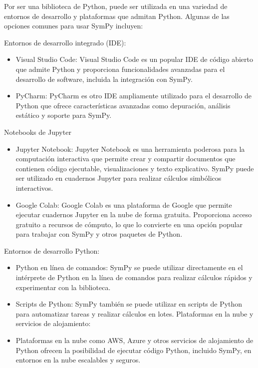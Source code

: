 \documentclass[11pt]{article}
\begin{document}
Por ser una biblioteca de Python, puede ser utilizada en una variedad de
entornos de desarrollo y plataformas que admitan Python. Algunas de las
opciones comunes para usar SymPy incluyen:

Entornos de desarrollo integrado (IDE):

\begin{itemize}
\item
  Visual Studio Code: Visual Studio Code es un popular IDE de código
  abierto que admite Python y proporciona funcionalidades avanzadas para
  el desarrollo de software, incluida la integración con SymPy.
\item
  PyCharm: PyCharm es otro IDE ampliamente utilizado para el desarrollo
  de Python que ofrece características avanzadas como depuración,
  análisis estático y soporte para SymPy.
\end{itemize}

Notebooks de Jupyter

\begin{itemize}
\item
  Jupyter Notebook: Jupyter Notebook es una herramienta poderosa para la
  computación interactiva que permite crear y compartir documentos que
  contienen código ejecutable, visualizaciones y texto explicativo.
  SymPy puede ser utilizado en cuadernos Jupyter para realizar cálculos
  simbólicos interactivos.
\item
  Google Colab: Google Colab es una plataforma de Google que permite
  ejecutar cuadernos Jupyter en la nube de forma gratuita. Proporciona
  acceso gratuito a recursos de cómputo, lo que lo convierte en una
  opción popular para trabajar con SymPy y otros paquetes de Python.
\end{itemize}

Entornos de desarrollo Python:

\begin{itemize}
\item
  Python en línea de comandos: SymPy se puede utilizar directamente en
  el intérprete de Python en la línea de comandos para realizar cálculos
  rápidos y experimentar con la biblioteca.
\item
  Scripts de Python: SymPy también se puede utilizar en scripts de
  Python para automatizar tareas y realizar cálculos en lotes.
  Plataformas en la nube y servicios de alojamiento:
\item
  Plataformas en la nube como AWS, Azure y otros servicios de
  alojamiento de Python ofrecen la posibilidad de ejecutar código
  Python, incluido SymPy, en entornos en la nube escalables y seguros.
\end{itemize}
\end{document}
